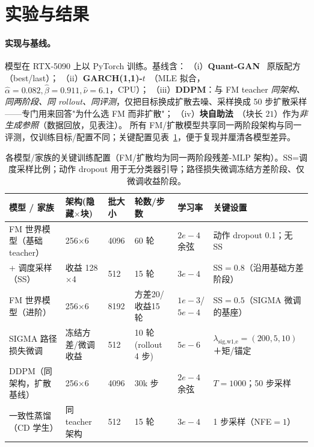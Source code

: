 \documentclass[11pt]{ctexart}
\begin{document}
\section{实验与结果}
\label{sec:results}

\paragraph{实现与基线。}模型在 RTX-5090 上以 PyTorch 训练。基线含：
（i）\textbf{Quant-GAN}~\citep{wiese2020quant} 原版配方（best/last）；
（ii）\textbf{GARCH(1,1)-$t$}~\citep{bollerslev1986garch,bollerslev1987conditionally}（MLE 拟合，$\hat\alpha{=}0.082,\hat\beta{=}0.911,\hat\nu{=}6.1$，CPU）；
（iii）\textbf{DDPM}：与 FM teacher \emph{同架构、同两阶段、同 rollout、同评测}，仅把目标换成扩散去噪、采样换成 50 步扩散采样——专门用来回答"为什么选 FM 而非扩散"；
（iv）\textbf{块自助法}~\citep{kunsch1989jackknife,politis1994stationary}（块长 $21$）作为\emph{非生成参照}（数据回放，见表注）。
所有 FM/扩散模型共享同一两阶段架构与同一评测，仅训练目标/配置不同；关键配置见表~\ref{tab:config}，便于复现并厘清各模型差异。

\begin{table}[t]
\centering
\caption{各模型/家族的关键训练配置（FM/扩散均为同一两阶段残差-MLP 架构）。SS=调度采样比例；动作 dropout 用于无分类器引导；路径损失微调冻结方差阶段、仅微调收益阶段。}
\label{tab:config}
\small
\begin{tabular}{l l l l l l}
\toprule
模型 / 家族 & 架构(隐藏$\times$块) & 批大小 & 轮数/步数 & 学习率 & 关键设置 \\
\midrule
FM 世界模型（基础 teacher） & 256$\times$6 & 4096 & 60 轮 & $2e{-}4$ 余弦 & 动作 dropout 0.1；无 SS \\
\quad + 调度采样（SS） & 收益 128$\times$4 & 512 & 15 轮 & $3e{-}4$ & SS$=0.8$（沿用基础方差阶段） \\
FM 世界模型（进阶） & 256$\times$6 & 8192 & 方差20/收益15 轮 & $1e{-}3$/$5e{-}4$ & SS$=0.5$（SIGMA 微调的基座） \\
SIGMA 路径损失微调 & 冻结方差/微调收益 & 512 & 10 轮(rollout 4 步) & $5e{-}6$ & $\lambda_{\text{sig,w1,e}}{=}(200,5,10)$＋矩/锚定 \\
DDPM（同架构，扩散基线） & 256$\times$6 & 4096 & 30k 步 & $2e{-}4$ 余弦 & $T{=}1000$；50 步采样 \\
一致性蒸馏（CD 学生） & 同 teacher 架构 & 512 & 15 轮 & $3e{-}4$ & 1 步采样（NFE$=1$） \\
\bottomrule
\end{tabular}
\end{table}
\end{document}
